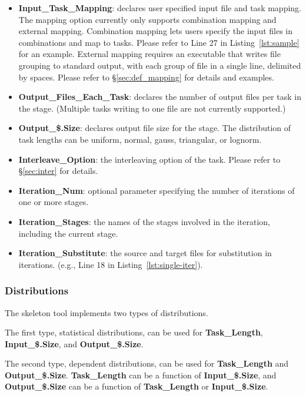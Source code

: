 \documentclass[10pt,a4paper]{article}
\begin{document}
\begin{itemize}
\item{\textbf{Input\_Task\_Mapping}:} declares user specified input file and task mapping. The mapping option currently only supports combination mapping and external mapping. 
Combination mapping lets users specify the input files in combinations and map to tasks. Please refer to Line 27 in Listing~\ref{lst:sample} for an example.
External mapping requires an executable that writes file grouping to standard output, with each group of file in a single line, delimited by spaces. Please refer to \S\ref{sec:def_mapping} for details and examples.

\item{\textbf{Output\_Files\_Each\_Task}:} declares the number of output files per task in the stage. (Multiple tasks writing to one file are not currently supported.)

\item{\textbf{Output\_\$.Size}:}  declares output file size for the stage. The distribution of task lengths can be uniform, normal, gauss, triangular, or lognorm. 

\item{\textbf{Interleave\_Option}:} the interleaving option of the task.
Please refer to \S\ref{sec:inter} for details.

\item{\textbf{Iteration\_Num}:} optional parameter specifying the number of iterations of one or more stages.

\item{\textbf{Iteration\_Stages}:} the names of the stages involved in the iteration, including the current stage. 

\item{\textbf{Iteration\_Substitute}:} the source and target files for substitution in iterations. (e.g., Line 18 in Listing~\ref{lst:single-iter}). 

\end{itemize}

\subsubsection{Distributions}\label{sec:distr}

The skeleton tool implements two types of distributions.

The first type, statistical distributions, can be used for \textbf{Task\_Length}, \textbf{Input\_\$.Size}, and \textbf{Output\_\$.Size}.

The second type, dependent distributions, can be used for \textbf{Task\_Length} and \textbf{Output\_\$.Size}.  \textbf{Task\_Length} can be a function of \textbf{Input\_\$.Size}, and \textbf{Output\_\$.Size} can be a function of  \textbf{Task\_Length} or \textbf{Input\_\$.Size}.
\end{document}
